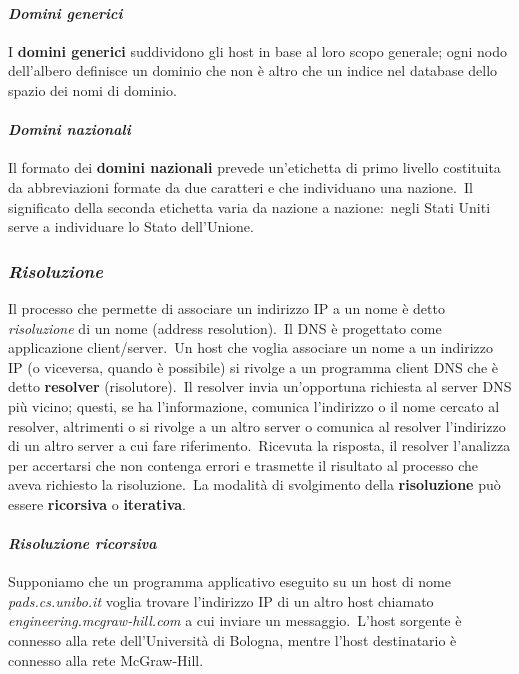 \paragraph{\emph{Domini generici}}

I \textbf{domini generici} suddividono gli host in base al loro scopo generale; ogni nodo dell'albero definisce un dominio che non è altro che un indice nel database dello spazio dei nomi di dominio.

\paragraph{\emph{Domini nazionali}}

Il formato dei \textbf{domini nazionali} prevede un'etichetta di primo livello costituita da abbreviazioni formate da due caratteri e che individuano una nazione.\
Il significato della seconda etichetta varia da nazione a nazione:\ negli Stati Uniti serve a individuare lo Stato dell'Unione.

\subsubsection{\emph{Risoluzione}}

Il processo che permette di associare un indirizzo IP a un nome è detto \emph{risoluzione} di un nome (address resolution).\
Il DNS è progettato come applicazione client/server.\
Un host che voglia associare un nome a un indirizzo IP (o viceversa, quando è possibile) si rivolge a un programma client DNS che è detto \textbf{resolver} (risolutore).\
Il resolver invia un'opportuna richiesta al server DNS più vicino; questi, se ha l'informazione, comunica l'indirizzo o il nome cercato al resolver, altrimenti o si rivolge a un altro server o comunica al resolver l'indirizzo di un altro server a cui fare riferimento.\
Ricevuta la risposta, il resolver l'analizza per accertarsi che non contenga errori e trasmette il risultato al processo che aveva richiesto la risoluzione.\
La modalità di svolgimento della \textbf{risoluzione} può essere \textbf{ricorsiva} o \textbf{iterativa}.

\paragraph{\emph{Risoluzione ricorsiva}}

Supponiamo che un programma applicativo eseguito su un host di nome \emph{pads.cs.unibo.it} voglia trovare l'indirizzo IP di un altro host chiamato \emph{engineering.mcgraw-hill.com} a cui inviare un messaggio.\
L'host sorgente è connesso alla rete dell'Università di Bologna, mentre l'host destinatario è connesso alla rete McGraw-Hill.

